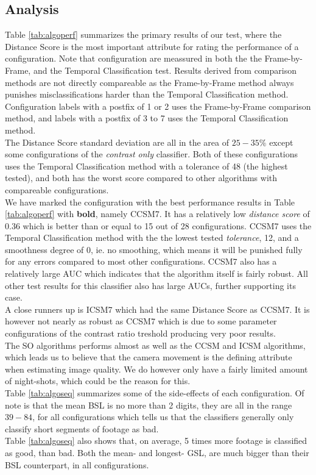 \subsection{Analysis}
%
Table \ref{tab:algoperf} summarizes the primary results of our test, where the Distance Score is the most important attribute for rating the performance of a configuration. Note that configuration are meassured in both the the Frame-by-Frame, and the Temporal Classification test. Results derived from comparison methods are not directly compareable as the Frame-by-Frame method always punishes misclassifications harder than the Temporal Classification method. Configuration labels with a postfix of 1 or 2 uses the Frame-by-Frame comparison method, and labels with a postfix of 3 to 7 uses the Temporal Classification method.\\
The Distance Score standard deviation are all in the area of $25-35\%$ except some configurations of the \textit{contrast only} classifier. Both of these configurations uses the Temporal Classification method with a tolerance of 48 (the highest tested), and both has the worst score compared to other algorithms with compareable configurations.\\
We have marked the configuration with the best performance results in Table \ref{tab:algoperf} with \textbf{bold}, namely CCSM7. It has a relatively low \textit{distance score} of $0.36$ which is better than or equal to 15 out of 28 configurations. CCSM7 uses the Temporal Classification method with the the lowest tested \textit{tolerance}, 12, and a smoothness degree of 0, ie. no smoothing, which means it will be punished fully for any errors compared to most other configurations. CCSM7 also has a relatively large AUC which indicates that the algorithm itself is fairly robust. All other test results for this classifier also has large AUCs, further supporting its case.\\
A close runners up is ICSM7 which had the same Distance Score as CCSM7. It is however not nearly as robust as CCSM7 which is due to some parameter configurations of the contrast ratio treshold producing very poor results.\\
The SO algorithms performs almost as well as the CCSM and ICSM algorithms, which leads us to believe that the camera movement is the defining attribute when estimating image quality. We do however only have a fairly limited amount of night-shots, which could be the reason for this.\\
Table \ref{tab:algoseq} summarizes some of the side-effects of each configuration. Of note is that the mean BSL is no more than 2 digits, they are all in the range $39-84$, for all configurations which tells us that the classifiers generally only classify short segments of footage as bad.\\
Table \ref{tab:algoseq} also shows that, on average, 5 times more footage is classified as good, than bad. Both the mean- and longest- GSL, are much bigger than their BSL counterpart, in all configurations.\\
%
%
